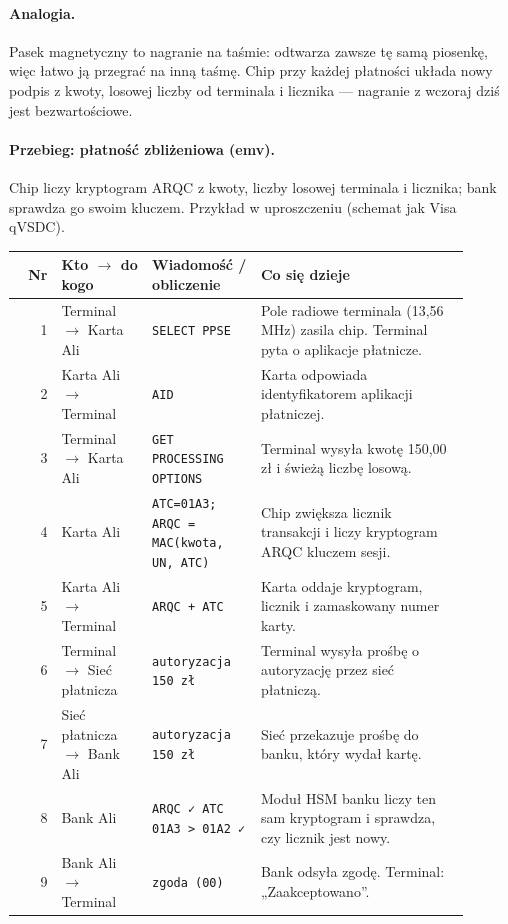 \paragraph{Analogia.} Pasek magnetyczny to nagranie na taśmie: odtwarza zawsze tę samą piosenkę, więc łatwo ją przegrać na inną taśmę. Chip przy każdej płatności układa nowy podpis z kwoty, losowej liczby od terminala i licznika — nagranie z wczoraj dziś jest bezwartościowe.

\paragraph{Przebieg: płatność zbliżeniowa (emv).} Chip liczy kryptogram ARQC z kwoty, liczby losowej terminala i licznika; bank sprawdza go swoim kluczem. Przykład w uproszczeniu (schemat jak Visa qVSDC).
\begingroup\footnotesize
\begin{longtable}{@{}r p{0.2\linewidth} p{0.24\linewidth} p{0.46\linewidth}@{}}
\toprule
Nr & Kto $\rightarrow$ do kogo & Wiadomość / obliczenie & Co się dzieje \\
\midrule
\endhead
1 & Terminal $\rightarrow$ Karta Ali & \texttt{SELECT PPSE} & Pole radiowe terminala (13,56 MHz) zasila chip. Terminal pyta o aplikacje płatnicze. \\
2 & Karta Ali $\rightarrow$ Terminal & \texttt{AID} & Karta odpowiada identyfikatorem aplikacji płatniczej. \\
3 & Terminal $\rightarrow$ Karta Ali & \texttt{GET PROCESSING OPTIONS} & Terminal wysyła kwotę 150,00 zł i świeżą liczbę losową. \\
4 & Karta Ali & \texttt{ATC=01A3; ARQC = MAC(kwota, UN, ATC)} & Chip zwiększa licznik transakcji i liczy kryptogram ARQC kluczem sesji. \\
5 & Karta Ali $\rightarrow$ Terminal & \texttt{ARQC + ATC} & Karta oddaje kryptogram, licznik i zamaskowany numer karty. \\
6 & Terminal $\rightarrow$ Sieć płatnicza & \texttt{autoryzacja 150 zł} & Terminal wysyła prośbę o autoryzację przez sieć płatniczą. \\
7 & Sieć płatnicza $\rightarrow$ Bank Ali & \texttt{autoryzacja 150 zł} & Sieć przekazuje prośbę do banku, który wydał kartę. \\
8 & Bank Ali & \texttt{ARQC ✓  ATC 01A3 > 01A2 ✓} & Moduł HSM banku liczy ten sam kryptogram i sprawdza, czy licznik jest nowy. \\
9 & Bank Ali $\rightarrow$ Terminal & \texttt{zgoda (00)} & Bank odsyła zgodę. Terminal: „Zaakceptowano”. \\
\bottomrule
\end{longtable}
\endgroup

